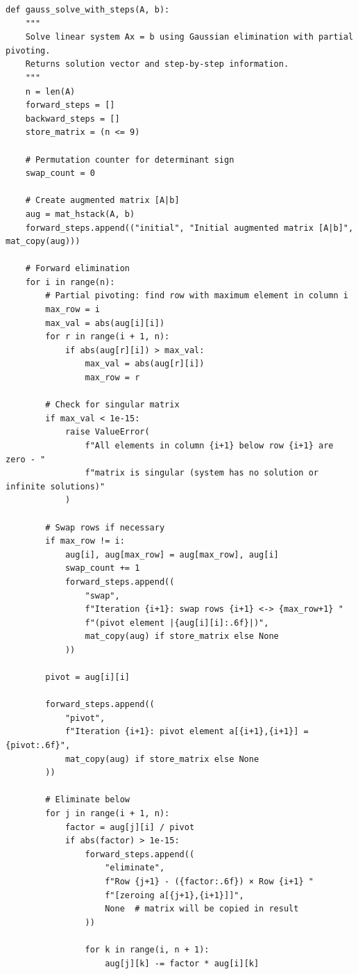 \documentclass[a4paper,12pt]{article}
\begin{document}
\begin{lstlisting}[style=intellij,caption={Код основной функции на Python}]
def gauss_solve_with_steps(A, b):
    """
    Solve linear system Ax = b using Gaussian elimination with partial pivoting.
    Returns solution vector and step-by-step information.
    """
    n = len(A)
    forward_steps = []
    backward_steps = []
    store_matrix = (n <= 9)

    # Permutation counter for determinant sign
    swap_count = 0

    # Create augmented matrix [A|b]
    aug = mat_hstack(A, b)
    forward_steps.append(("initial", "Initial augmented matrix [A|b]", mat_copy(aug)))

    # Forward elimination
    for i in range(n):
        # Partial pivoting: find row with maximum element in column i
        max_row = i
        max_val = abs(aug[i][i])
        for r in range(i + 1, n):
            if abs(aug[r][i]) > max_val:
                max_val = abs(aug[r][i])
                max_row = r

        # Check for singular matrix
        if max_val < 1e-15:
            raise ValueError(
                f"All elements in column {i+1} below row {i+1} are zero - "
                f"matrix is singular (system has no solution or infinite solutions)"
            )

        # Swap rows if necessary
        if max_row != i:
            aug[i], aug[max_row] = aug[max_row], aug[i]
            swap_count += 1
            forward_steps.append((
                "swap",
                f"Iteration {i+1}: swap rows {i+1} <-> {max_row+1} "
                f"(pivot element |{aug[i][i]:.6f}|)",
                mat_copy(aug) if store_matrix else None
            ))

        pivot = aug[i][i]

        forward_steps.append((
            "pivot",
            f"Iteration {i+1}: pivot element a[{i+1},{i+1}] = {pivot:.6f}",
            mat_copy(aug) if store_matrix else None
        ))

        # Eliminate below
        for j in range(i + 1, n):
            factor = aug[j][i] / pivot
            if abs(factor) > 1e-15:
                forward_steps.append((
                    "eliminate",
                    f"Row {j+1} - ({factor:.6f}) × Row {i+1} "
                    f"[zeroing a[{j+1},{i+1}]]",
                    None  # matrix will be copied in result
                ))

                for k in range(i, n + 1):
                    aug[j][k] -= factor * aug[i][k]


\end{lstlisting}
\end{document}
